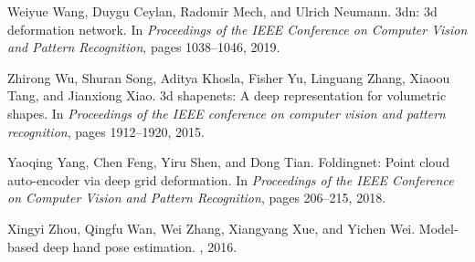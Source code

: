 \documentclass[10pt,twocolumn,letterpaper]{article}
\begin{document}
\begin{thebibliography}{10}
Weiyue Wang, Duygu Ceylan, Radomir Mech, and Ulrich Neumann.
\newblock 3dn: 3d deformation network.
\newblock In {\em Proceedings of the IEEE Conference on Computer Vision and
  Pattern Recognition}, pages 1038--1046, 2019.

Zhirong Wu, Shuran Song, Aditya Khosla, Fisher Yu, Linguang Zhang, Xiaoou Tang,
  and Jianxiong Xiao.
\newblock 3d shapenets: A deep representation for volumetric shapes.
\newblock In {\em Proceedings of the IEEE conference on computer vision and
  pattern recognition}, pages 1912--1920, 2015.

Yaoqing Yang, Chen Feng, Yiru Shen, and Dong Tian.
\newblock Foldingnet: Point cloud auto-encoder via deep grid deformation.
\newblock In {\em Proceedings of the IEEE Conference on Computer Vision and
  Pattern Recognition}, pages 206--215, 2018.

Xingyi Zhou, Qingfu Wan, Wei Zhang, Xiangyang Xue, and Yichen Wei.
\newblock Model-based deep hand pose estimation.
, 2016.

\end{thebibliography}
\end{document}
